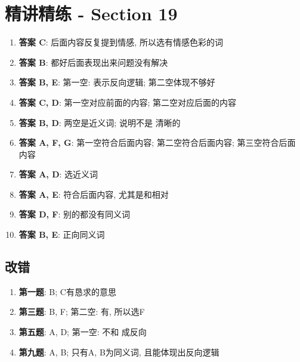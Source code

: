 \section{精讲精练 - Section 19}

  \begin{enumerate}
    \item \textbf{答案 C}: 后面内容反复提到情感, 所以选有情感色彩的词
    \item \textbf{答案 B}: 都好后面表现出来问题没有解决
    \item \textbf{答案 B, E}: 第一空: 表示反向逻辑; 第二空体现不够好
    \item \textbf{答案 C, D}: 第一空对应前面的内容; 第二空对应后面的内容
    \item \textbf{答案 B, D}: 两空是近义词; 说明不是
    清晰的
    \item \textbf{答案 A, F, G}: 第一空符合后面内容; 第二空符合后面内容; 第三空符合后面
    内容
    \item \textbf{答案 A, D}: 选近义词
    \item \textbf{答案 A, E}: 符合后面内容, 尤其是和相对
    \item \textbf{答案 D, F}: 别的都没有同义词
    \item \textbf{答案 B, E}: 正向同义词
  \end{enumerate}

  \subsection{改错}

    \begin{enumerate}
      \item \textbf{第一题}: B; C有恳求的意思
      \item \textbf{第三题}: B, F; 第二空: 有, 所以选F
      \item \textbf{第五题}: A, D; 第一空: 不和
      成反向
      \item \textbf{第九题}: A, B; 只有A, B为同义词, 且能体现出反向逻辑
    \end{enumerate}
